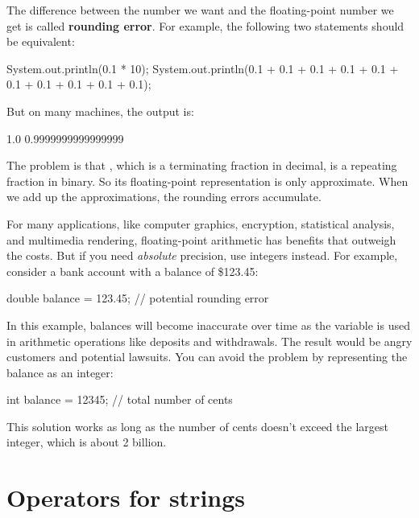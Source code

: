 
The difference between the number we want and the floating-point number we get is called {\bf rounding error}.
For example, the following two statements should be equivalent:

\begin{code}
System.out.println(0.1 * 10);
System.out.println(0.1 + 0.1 + 0.1 + 0.1 + 0.1
                 + 0.1 + 0.1 + 0.1 + 0.1 + 0.1);
\end{code}

But on many machines, the output is:

\begin{stdout}
1.0
0.9999999999999999
\end{stdout}

The problem is that , which is a terminating fraction in decimal, is a repeating fraction in binary.
So its floating-point representation is only approximate.
When we add up the approximations, the rounding errors accumulate.

For many applications, like computer graphics, encryption, statistical analysis, and multimedia rendering, floating-point arithmetic has benefits that outweigh the costs.
But if you need {\em absolute} precision, use integers instead.
For example, consider a bank account with a balance of \$123.45:

\begin{code}
double balance = 123.45;  // potential rounding error
\end{code}

In this example, balances will become inaccurate over time as the variable is used in arithmetic operations like deposits and withdrawals.
The result would be angry customers and potential lawsuits.
You can avoid the problem by representing the balance as an integer:

\begin{code}
int balance = 12345;      // total number of cents
\end{code}


This solution works as long as the number of cents doesn't exceed the largest integer, which is about 2 billion.


\section{Operators for strings}

